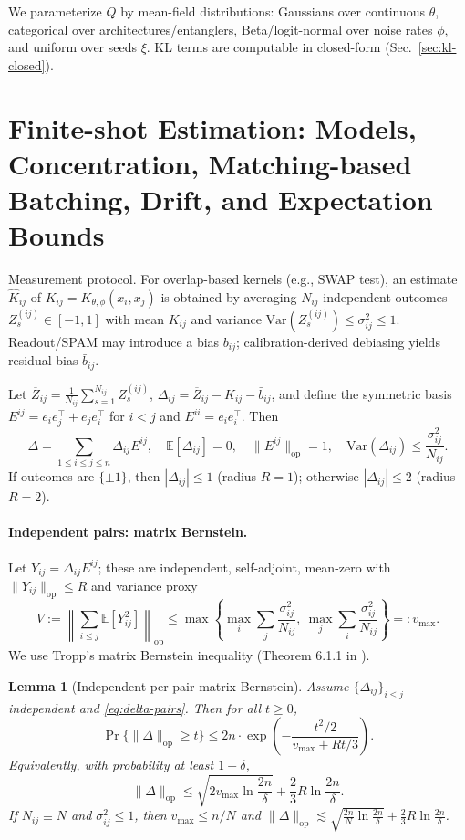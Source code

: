 \documentclass{article}
\newtheorem{lemma}{Lemma}
\begin{document}
We parameterize $Q$ by mean-field distributions: Gaussians over continuous $\theta$, categorical over architectures/entanglers, Beta/logit-normal over noise rates $\phi$, and uniform over seeds $\xi$. KL terms are computable in closed-form (Sec.~\ref{sec:kl-closed}).

\section{Finite-shot Estimation: Models, Concentration, Matching-based Batching, Drift, and Expectation Bounds}\label{sec:finite-shot}
Measurement protocol. For overlap-based kernels (e.g., SWAP test), an estimate $\widehat{K}_{ij}$ of $K_{ij}=K_{\theta,\phi}(x_i,x_j)$ is obtained by averaging $N_{ij}$ independent outcomes $Z^{(ij)}_s\in[-1,1]$ with mean $K_{ij}$ and variance $\mathrm{Var}(Z^{(ij)}_s)\le \sigma^2_{ij}\le 1$. Readout/SPAM may introduce a bias $b_{ij}$; calibration-derived debiasing yields residual bias $\bar{b}_{ij}$.

Let $\overline{Z}_{ij}=\frac{1}{N_{ij}}\sum_{s=1}^{N_{ij}} Z^{(ij)}_s$, $\Delta_{ij}=\overline{Z}_{ij}-K_{ij}-\bar{b}_{ij}$, and define the symmetric basis $E^{ij}=e_ie_j^\top+e_je_i^\top$ for $i<j$ and $E^{ii}=e_ie_i^\top$. Then
\begin{equation}\label{eq:delta-pairs}
\Delta=\sum_{1\le i\le j\le n} \Delta_{ij} E^{ij},\quad \mathbb{E}[\Delta_{ij}]=0,\quad \|E^{ij}\|_{\mathrm{op}}=1,\quad \mathrm{Var}(\Delta_{ij})\le \frac{\sigma^2_{ij}}{N_{ij}}.
\end{equation}
If outcomes are $\{\pm 1\}$, then $|\Delta_{ij}|\le 1$ (radius $R=1$); otherwise $|\Delta_{ij}|\le 2$ (radius $R=2$).

\paragraph{Independent pairs: matrix Bernstein.} Let $Y_{ij}=\Delta_{ij}E^{ij}$; these are independent, self-adjoint, mean-zero with $\|Y_{ij}\|_{\mathrm{op}}\le R$ and variance proxy
\[
V:=\left\|\sum_{i\le j} \mathbb{E}[Y_{ij}^2]\right\|_{\mathrm{op}} \le \max\left\{\max_i \sum_{j} \frac{\sigma^2_{ij}}{N_{ij}},\ \max_j \sum_i \frac{\sigma^2_{ij}}{N_{ij}}\right\}=:v_{\max}.
\]
We use Tropp’s matrix Bernstein inequality (Theorem 6.1.1 in \cite{tropp2012user}).

\begin{lemma}[Independent per-pair matrix Bernstein]\label{lem:bernstein-pair}
Assume $\{\Delta_{ij}\}_{i\le j}$ independent and \eqref{eq:delta-pairs}. Then for all $t\ge 0$,
\[
\Pr\{\|\Delta\|_{\mathrm{op}} \ge t\} \le 2n \cdot \exp\left( -\frac{t^2/2}{v_{\max} + Rt/3} \right).
\]
Equivalently, with probability at least $1-\delta$,
\[
\|\Delta\|_{\mathrm{op}} \le \sqrt{2 v_{\max}\ln\frac{2n}{\delta}} + \frac{2}{3} R \ln\frac{2n}{\delta}.
\]
If $N_{ij}\equiv N$ and $\sigma^2_{ij}\le 1$, then $v_{\max}\le n/N$ and
$\|\Delta\|_{\mathrm{op}} \lesssim \sqrt{\tfrac{2n}{N}\ln\frac{2n}{\delta}} + \tfrac{2}{3}R\ln\frac{2n}{\delta}$.
\end{lemma}
\end{document}
